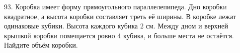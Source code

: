 93. Коробка имеет форму прямоугольного параллелепипеда. Дно коробки квадратное, а высота коробки составляет треть её ширины. В коробке лежат одинаковые кубики. Высота каждого кубика 2 см. Между дном и верхней крышкой коробки помещается ровно 4 кубика, и больше места не остаётся. Найдите объём коробки.\\
